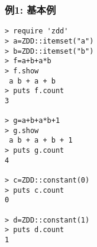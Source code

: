 \subsubsection*{例1: 基本例}



\begin{Verbatim}[baselinestretch=0.7,frame=single]
> require 'zdd'
> a=ZDD::itemset("a")
> b=ZDD::itemset("b")
> f=a+b+a*b
> f.show
 a b + a + b
> puts f.count
3

> g=a+b+a*b+1
> g.show
 a b + a + b + 1
> puts g.count
4

> c=ZDD::constant(0)
> puts c.count
0

> d=ZDD::constant(1)
> puts d.count
1
\end{Verbatim}
